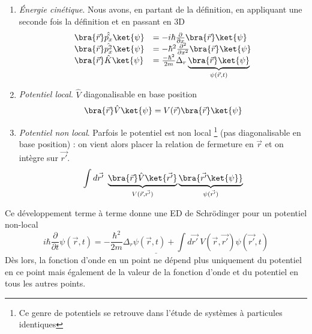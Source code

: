 	\begin{enumerate}
	\item \textit{Énergie cinétique}. Nous avons, en partant de la définition, en appliquant une 
	seconde fois la définition et en passant en 3D
	\begin{equation}
	\begin{array}{ll}
	\bra{\vec{r}}\hat{\hat{p_x}}\ket{\psi} &= -i\hbar\frac{\partial}{\partial x}\bra{\vec{r}}\ket{\psi}\\
	\bra{\vec{r}}\hat{p_x^2}\ket{\psi} &= -\hbar^2\frac{\partial^2}{\partial x^2}\bra{\vec{r}}\ket{\psi}	\\
	\bra{\vec{r}}\hat{K}\ket{\psi} &= \frac{-\hbar^2}
	{2m}\Delta_r\underbrace{\bra{\vec{r}}\ket{\psi}}_{\psi(\vec{r},t)}
	\end{array}
	\end{equation}
	
	\item \textit{Potentiel local}. $\hat V$ diagonalisable en base position
	\begin{equation}
	\bra{\vec{r}}\hat{V}\ket{\psi} = V(\vec{r})\bra{\vec{r}}\ket{\psi}
	\end{equation}
	
	\item \textit{Potentiel non local}. Parfois le potentiel est non local \footnote{Ce genre de potentiels se retrouve
	dans l'étude de systèmes à particules identiques} (pas diagonalisable en base position) : on vient 
	alors placer la relation de fermeture en $\vec r$ et on intègre sur $\vec{r'}$.
	\begin{equation}
	\int d\vec{r'}\ \underbrace{\bra{\vec{r}}\hat{V}\ket{\vec{r'}}}_{V(\vec{r},\vec{r'})}\underbrace{
	\bra{\vec{r'}\ket{\psi}}}_{\psi(\vec{r'})}
	\end{equation}
	\end{enumerate}
	Ce développement terme à terme donne une ED de Schrödinger pour un potentiel non-local
	\begin{equation}
	\underline{i\hbar\frac{\partial}{\partial t}\psi(\vec{r},t) = -\frac{\hbar^2}{2m}\Delta_r\psi(\vec{r},t)+\int 
	d\vec{r'}\ V(\vec{r},\vec{r'})\psi(\vec{r'},t)}
	\end{equation}
	Dès lors, la fonction d'onde en un point ne dépend plus uniquement du potentiel en ce point mais
	également de la valeur de la fonction d'onde et du potentiel en tous les autres points.

